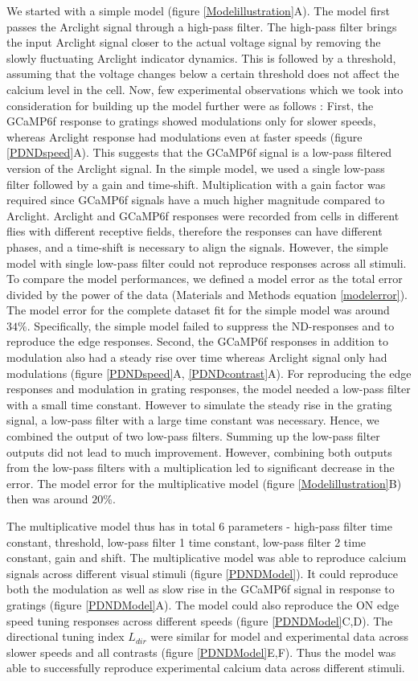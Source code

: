 \documentclass[9pt,lineno]{elife}
\begin{document}
We started with a simple model (figure \ref{Modelillustration}A). The model first passes the Arclight signal through a high-pass filter. The high-pass filter brings the input Arclight signal closer to the actual voltage signal by removing the slowly fluctuating Arclight indicator dynamics. This is followed by a threshold, assuming that the voltage changes below a certain threshold does not affect the calcium level in the cell. Now, few experimental observations which we took into consideration for building up the model further were as follows : First, the GCaMP6f response to gratings showed modulations only for slower speeds, whereas Arclight response had modulations even at faster speeds (figure \ref{PDNDspeed}A). This suggests that the GCaMP6f signal is a low-pass filtered version of the Arclight signal. In the simple model, we used a single low-pass filter followed by a gain and time-shift. Multiplication with a gain factor was required since GCaMP6f signals have a much higher magnitude compared to Arclight. Arclight and GCaMP6f responses were recorded from cells in different flies with different receptive fields, therefore the responses can have different phases, and a time-shift is necessary to align the signals. However, the simple model with single low-pass filter could not reproduce responses across all stimuli. To compare the model performances, we defined a model error as the total error divided by the power of the data (Materials and Methods equation \eqref{modelerror}). The model error for the complete dataset fit for the simple model was around $34\%$. Specifically, the simple model failed to suppress the ND-responses and to reproduce the edge responses. Second, the GCaMP6f responses in addition to modulation also had a steady rise over time whereas Arclight signal only had modulations (figure \ref{PDNDspeed}A, \ref{PDNDcontrast}A). For reproducing the edge responses and modulation in grating responses, the model needed a low-pass filter with a small time constant. However to simulate the steady rise in the grating signal, a low-pass filter with a large time constant was necessary. Hence, we combined the output of two low-pass filters. Summing up the low-pass filter outputs did not lead to much improvement. However, combining both outputs from the low-pass filters with a multiplication led to significant decrease in the error. The model error for the multiplicative model (figure \ref{Modelillustration}B) then was around $20\%$. 

The multiplicative model thus has in total 6 parameters - high-pass filter time constant, threshold, low-pass filter 1 time constant, low-pass filter 2 time constant, gain and shift.  The multiplicative model was able to reproduce calcium signals across different visual stimuli (figure \ref{PDNDModel}). It could reproduce both the modulation as well as slow rise in the GCaMP6f signal in response to gratings (figure \ref{PDNDModel}A). The model could also reproduce the ON edge speed tuning responses across different speeds (figure \ref{PDNDModel}C,D). The directional tuning index $L_{dir}$ were similar for model and experimental data across slower speeds and all contrasts (figure \ref{PDNDModel}E,F). Thus the model was able to successfully reproduce experimental calcium data across different stimuli.  
\end{document}
